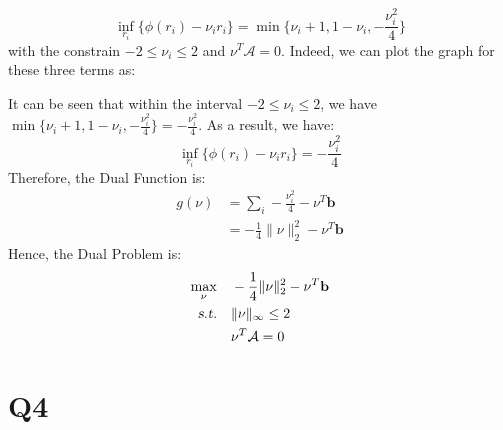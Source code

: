 \documentclass[10pt,a4paper]{article}
\begin{document}
\begin{equation*}
	\displaystyle\inf_{r_{i}}\{ \phi(r_{i}) - \nu_{i} r_{i} \} = \displaystyle\min \{ \nu_{i} + 1, 1 - \nu_{i}, -\frac{\nu_{i}^{2}}{4} \}
\end{equation*}
with the constrain $-2 \leq \nu_{i} \leq 2$ and $\nu^{T} \mathcal{A} = 0$. Indeed, we can plot the graph for these three terms as:
\begin{center}
\end{center}
It can be seen that within the interval $-2 \leq \nu_{i} \leq 2$, we have $\displaystyle\min \{ \nu_{i} + 1, 1 - \nu_{i}, -\frac{\nu_{i}^{2}}{4} \} = - \frac{\nu_{i}^{2}}{4}$. As a result, we have:
\begin{equation*}
	\displaystyle\inf_{r_{i}}\{ \phi(r_{i}) - \nu_{i} r_{i} \} = - \frac{\nu_{i}^{2}}{4}
\end{equation*}
Therefore, the Dual Function is:
\begin{equation*}
	\begin{aligned}
	g(\nu) &= \displaystyle\sum_{i} - \frac{\nu_{i}^{2}}{4} - \nu^{T} \mathbf{b} \\
	&= -\frac{1}{4} \| \nu \|_{2}^{2} - \nu^{T} \mathbf{b}
	\end{aligned}
\end{equation*}
Hence, the Dual Problem is:
\begin{equation*}
	\begin{aligned}
		\displaystyle\max_{\nu} \quad & -\frac{1}{4} \| \nu \|_{2}^{2} - \nu^{T} \mathbf{b} \\
		\textsl{s.t.} \quad & \| \nu \|_{\infty} \leq 2 \\
		& \nu^{T} \mathcal{A} = 0
	\end{aligned}
\end{equation*}

\section*{Q4}
\end{document}
